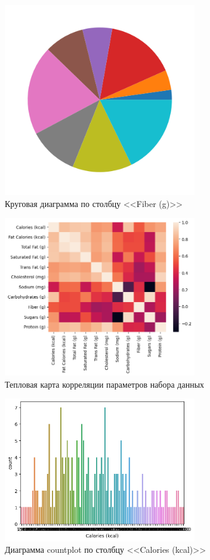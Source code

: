 \documentclass[14pt, a4paper]{article}
\begin{document}
    \begin{figure}[H]
        \centering
        \includegraphics[width=0.75\textwidth]{images/piechart.png}
        \caption{Круговая диаграмма по столбцу <<Fiber (g)>>}
    \end{figure}

    \begin{figure}[H]
        \centering
        \includegraphics[width=0.75\textwidth]{images/heatmap.png}
        \caption{Тепловая карта корреляции параметров набора данных}
    \end{figure}

    \begin{figure}[H]
        \centering
        \includegraphics[width=0.75\textwidth]{images/countplot.png}
        \caption{Диаграмма countplot по столбцу <<Calories (kcal)>>}
    \end{figure}
\end{document}
